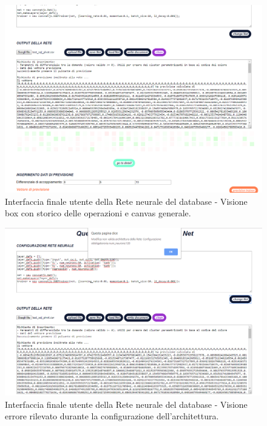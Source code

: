 \begin{figure}[H]
\centering
	\includegraphics[width=1\linewidth]{./image/Rete-di-prova_db2.png}
	\caption{Interfaccia finale utente della Rete neurale del database - Visione box con storico delle operazioni e canvas generale.}
	\label{Interfaccia finale utente della Rete neurale del database -2.}
\end{figure}
\noindent

\begin{figure}[H]
\centering
	\includegraphics[width=1\linewidth]{./image/Rete-di-prova_db3.png}
	\caption{Interfaccia finale utente della Rete neurale del database - Visione errore rilevato durante la configurazione dell'architettura.}
	\label{Interfaccia finale utente della Rete neurale del database -3.}
\end{figure}
\noindent
